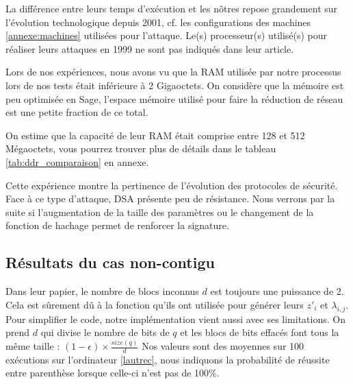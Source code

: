 \documentclass{backend}
\begin{document}
La différence entre leurs temps d'exécution et les nôtres repose grandement sur l'évolution technologique depuis 2001, cf. les configurations des machines \ref{annexe:machines} utilisées pour l'attaque. Le(s) processeur(s) utilisé(s) pour réaliser leurs attaques en 1999 ne sont pas indiqués dans leur article.\medbreak

Lors de nos expériences, nous avons vu que la RAM utilisée par notre processus lors de nos tests était inférieure à 2 Gigaoctets. On considère que la mémoire est peu optimisée en Sage, l'espace mémoire utilisé pour faire la réduction de réseau est une petite fraction de ce total.
 
On estime que la capacité de leur RAM était comprise entre 128 et 512 Mégaoctets, vous pourrez trouver plus de détails dans le tableau \ref{tab:ddr_comparaison} en annexe.


\medbreak

Cette expérience montre la pertinence de l'évolution des protocoles de sécurité. Face à ce type d'attaque, DSA présente peu de résistance. Nous verrons par la suite si l'augmentation de la taille des paramètres ou le changement de la fonction de hachage permet de renforcer la signature.


\subsection{Résultats du cas non-contigu}

Dans leur papier, le nombre de blocs inconnus $d$ est toujours une puissance de 2. Cela est sûrement dû à la fonction qu'ils ont utilisée pour générer leurs $z'_i$ et $\lambda_{i,j}$. Pour simplifier le code, notre implémentation vient aussi avec ses limitations. On prend $d$ qui divise le nombre de bits de $q$ et les blocs de bits effacés font tous la même taille : $(1-\epsilon)\times\frac{size(q)}{d}$ \smallbreak
Nos valeurs sont des moyennes sur 100 exécutions sur l'ordinateur \ref{lautrec}, nous indiquons la probabilité de réussite entre parenthèse lorsque celle-ci n'est pas de 100\%.
\end{document}
